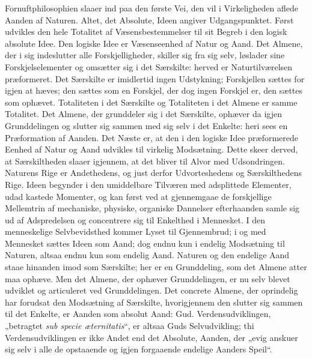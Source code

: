 \documentclass[12pt]{book}
\begin{document}
Fornuftphilosophien slaaer ind paa den første Vei, den vil i
Virkeligheden aflede Aanden af Naturen. Altet, det Absolute, Ideen
angiver Udgangspunktet. Først udvikles den hele Totalitet af
Væsensbestemmelser til sit Begreb i den logisk absolute Idee. Den
logiske Idee er Væsenseenhed af Natur og Aand. Det Almene, der i sig
indeslutter alle Forskjelligheder, skiller sig fra sig selv,
løslader sine Forskjelselementer og omsætter sig i det Særskilte:
herved er Naturtilværelsen præformeret. Det Særskilte er imidlertid
ingen Udstykning; Forskjellen sættes for igjen at hæves; den sættes
som en Forskjel, der dog ingen Forskjel er, den sættes som ophævet.
Totaliteten i det Særskilte og Totaliteten i det Almene er samme
Totalitet. Det Almene, der grunddeler sig i det Særskilte, ophæver
da igjen Grunddelingen og slutter sig sammen med sig selv i det
Enkelte: heri sees en Præformation af Aanden. Det Næste er, at den i
den logiske Idee præformerede Eenhed af Natur og Aand udvikles til
virkelig Modsætning. Dette skeer derved, at Særskiltheden slaaer
igjennem, at det bliver til Alvor med Udsondringen. Naturens Rige er
Andethedens, og just derfor Udvorteshedens og Særskilthedens Rige.
Ideen begynder i den umiddelbare Tilværen med adsplittede
Elementer, udad kastede Momenter, og kan først ved at gjennemgaae de
forskjellige Mellemtrin af mechaniske, physiske, organiske Dannelser
efterhaanden samle sig ud af Adspredelsen og concentrere sig til
Enkelthed i Mennesket. I den menneskelige Selvbevidsthed kommer
Lyset til Gjennembrud; i og med Mennesket sættes Ideen som Aand; dog
endnu kun i endelig Modsætning til Naturen, altsaa endnu kun som
endelig Aand. Naturen og den endelige Aand staae hinanden imod som
Særskilte; her er en Grunddeling, som det Almene atter maa ophæve.
Men det Almene, der ophæver Grunddelingen, er nu selv blevet udviklet
og articuleret ved Grunddelingen. Det concrete Almene, der
oprindelig har forudsat den Modsætning af Særskilte, hvorigjennem
den slutter sig sammen til det Enkelte, er Aanden som absolut Aand:
Gud. Verdensudviklingen, „betragtet \textit{sub specie
æternitatis}“, er altsaa Guds Selvudvikling; thi Verdensudviklingen
er ikke Andet end det Absolute, Aanden, der „evig anskuer sig selv i
alle de opstaaende og igjen forgaaende endelige Aanders Speil“.
\end{document}
